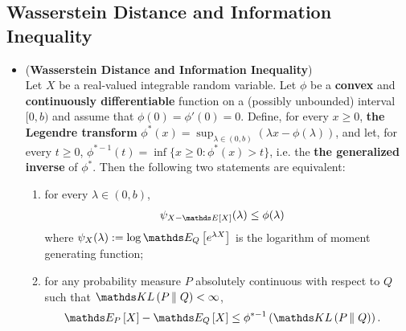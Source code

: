 \documentclass[11pt]{article}
\begin{document}
\subsection{Wasserstein Distance and Information Inequality}
\begin{itemize}
\item \begin{proposition} (\textbf{Wasserstein Distance and Information Inequality}) \citep{boucheron2013concentration}\\
Let $X$ be a real-valued integrable random variable. Let $\phi$ be a \textbf{convex} and \textbf{continuously differentiable} function on a (possibly unbounded) interval $[0, b)$ and assume that $\phi(0) = \phi'(0) = 0$. Define, for every $x \ge 0$, \textbf{the Legendre transform} $\phi^{*}(x) = \sup_{\lambda \in (0,b)}(\lambda x - \phi(\lambda))$, and let, for every $t \ge 0$, $\phi^{*-1}(t) = \inf\{x \ge 0: \phi^{*}(x) > t\}$, i.e. the \textbf{the generalized inverse} of $\phi^{*}$. Then the following two statements are equivalent:
\begin{enumerate}
\item for every $\lambda \in (0,b)$,
\begin{align*}
\psi_{X - \E{}{X}}(\lambda) &\le \phi(\lambda)
\end{align*} where $\psi_{X}(\lambda):= \log\E{Q}{e^{\lambda X}}$ is the logarithm of moment generating function;
\item for any probability measure $P$ absolutely continuous with respect to $Q$ such that $\kl{P}{Q} < \infty$,
\begin{align}
\E{P}{X} - \E{Q}{X} &\le \phi^{*-1}\paren{\kl{P}{Q}}. \label{ineqn: information_inequality_general}
\end{align} 


\end{enumerate}
\end{proposition}
\end{itemize}
\end{document}
